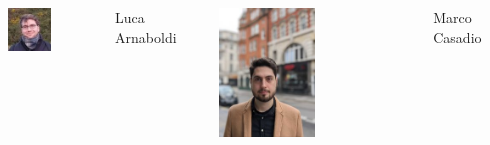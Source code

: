 \documentclass[t,compress,aspectratio=169]{beamer}
\begin{document}
\begin{frame}
\begin{columns}
   \centering
\vspace{-3em}
    \includegraphics[width=0.5\textwidth]{img/Luca.jpeg}
      \vspace{2em}
    \begin{block}{\centering\footnotesize{Luca Arnaboldi}}
   \end{block}
  \includegraphics[width=0.5\textwidth]{img/Marco.jpg}
    \vspace{-1em}
        \begin{block}{\centering\footnotesize{Marco Casadio}}
     \end{block}



\end{columns}
\end{frame}
\end{document}
